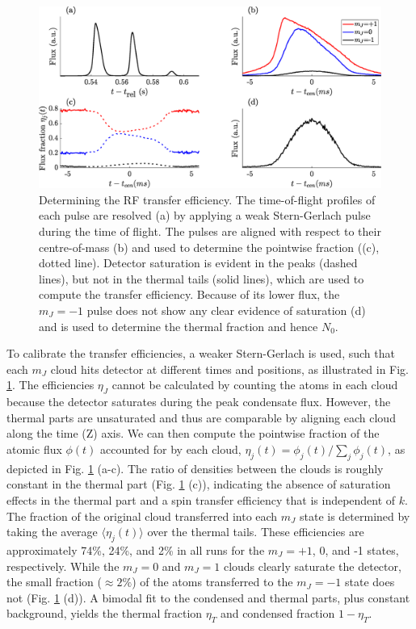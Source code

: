 	\begin{figure}
	\begin{center}
		\includegraphics[width=\columnwidth]{fig/QD/frac_cal_profile.eps}
		\caption{Determining the RF transfer efficiency. The time-of-flight profiles of each pulse are resolved (a) by applying a weak Stern-Gerlach pulse during the time of flight. The pulses are aligned with respect to their centre-of-mass (b) and used to determine the pointwise fraction ((c), dotted line). Detector saturation is evident in the peaks (dashed lines), but not in the thermal tails (solid lines), which are used to compute the transfer efficiency. Because of its lower flux, the $m_J=-1$ pulse does not show any clear evidence of saturation (d) and is used to determine the thermal fraction and hence $N_0$.}
		\label{fig:frac_cal}
	\end{center}
	\end{figure}
	To calibrate the transfer efficiencies, a weaker Stern-Gerlach is used, such that each $m_J$ cloud hits detector at different times and positions, as illustrated in Fig. \ref{fig:frac_cal}. 
	The efficiencies $\eta_J$ cannot be calculated by counting the atoms in each cloud because the detector saturates during the peak condensate flux.
	However, the thermal parts are unsaturated and thus are comparable by aligning each cloud along the time (Z) axis.
	We can then compute the pointwise fraction of the atomic flux $\phi(t)$ accounted for by each cloud, $\eta_j(t) = \phi_j(t)/\sum_j\phi_j(t)$, as depicted in Fig. \ref{fig:frac_cal} (a-c).
	The ratio of densities between the clouds is roughly constant in the thermal part (Fig. \ref{fig:frac_cal} (c)), indicating the absence of saturation effects in the thermal part and a spin transfer efficiency that is independent of $k$. 
	The fraction of the original cloud transferred into each $m_J$ state is determined by taking the average $\langle\eta_j(t)\rangle$ over the thermal tails. 
	These efficiencies are approximately 74\%, 24\%, and 2\% in all runs for the $m_J=+1$, 0, and -1 states, respectively.
	While the $m_J=0$ and $m_J=1$ clouds clearly saturate the detector, the small fraction ($\approx2\%$) of the atoms transferred to the $m_J=-1$ state does not (Fig. \ref{fig:frac_cal} (d)). 
	A bimodal fit to the condensed and thermal parts, plus constant background, yields the thermal fraction $\eta_T$ and condensed fraction $1-\eta_T$.




